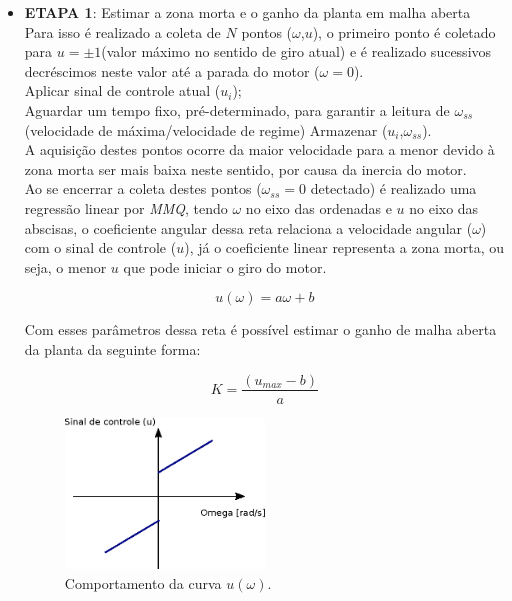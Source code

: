 \begin{itemize}
    \item \textbf{ETAPA 1}: Estimar a zona morta e o ganho da planta em malha aberta\\
    
    Para isso é realizado a coleta de $N$ pontos ($\omega$,$u$), o primeiro ponto é coletado para $u = \pm1$(valor máximo no sentido de giro atual) e é realizado sucessivos decréscimos neste valor até a parada do motor ($\omega = 0$). \\
    
    Aplicar sinal de controle atual ($u_i$);\\
    Aguardar um tempo fixo, pré-determinado, para garantir a leitura de $\omega_{ss}$(velocidade de máxima/velocidade de regime)
    Armazenar ($u_i$,$\omega_{ss}$).\\
    
    A aquisição destes pontos ocorre da maior velocidade para a menor devido à zona morta ser mais baixa neste sentido, por causa da inercia do motor.\\
    
    Ao se encerrar a coleta destes pontos ($\omega_{ss} = 0$ detectado) é realizado uma regressão linear por \textit{MMQ}, tendo $\omega$ no eixo das ordenadas e $u$ no eixo das abscisas, o coeficiente angular dessa reta relaciona a velocidade angular ($\omega$) com o sinal de controle ($u$), já o coeficiente linear representa a zona morta, ou seja, o menor $u$ que pode iniciar o giro do motor.
    
    \begin{equation*}
        u(\omega) = a\omega + b
    \end{equation*}
    
    Com esses parâmetros dessa reta é possível estimar o ganho de malha aberta da planta da seguinte forma:
    
    \begin{equation*}
        K = \frac{(u_{max} - b)}{a}
    \end{equation*}
        
    \begin{figure}[H]
        \centering
        \includegraphics[width=0.5\textwidth]{imagens/ilustracoes/omega_x_sinal_controle.eps}
        \caption{Comportamento da curva $u(\omega)$.}
        \label{fig:ilustracao_omega_x_pwm}
    \end{figure}    
        

\end{itemize}
